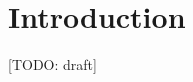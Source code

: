 \documentclass[10pt,twocolumn,letterpaper]{article}
\newcommand{\todo}[1]{{\color{red}[TODO: #1]}}
\newcommand{\XX}{{\color{red}XX}}
\begin{document}
\section{Introduction}
\label{sec:intro}
\todo{draft}

\end{document}
